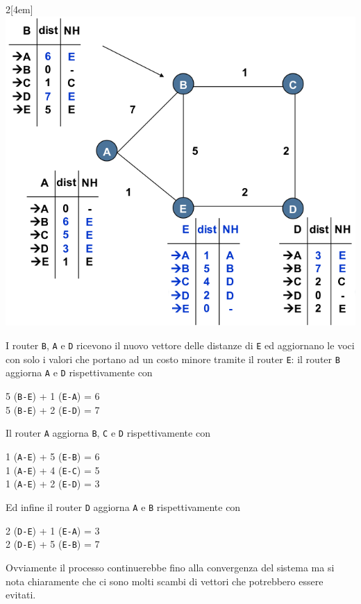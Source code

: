 \documentclass[12pt]{article}
\def\code#1{\texttt{#1}}
\begin{document}
\begin{multicols}{2}[\columnsep4em] 	
	\includegraphics[scale=0.3]{livello_di_rete-img12.png}
	\columnbreak
	
	I router \code{B}, \code{A} e \code{D} ricevono il nuovo vettore delle distanze di \code{E} ed aggiornano le voci con 
	solo i valori che portano ad un costo minore tramite il router \code{E}: il router \code{B} aggiorna \code{A} e \code{D} 
	rispettivamente con
	\begin{center}
		5 (\code{B-E}) + 1 (\code{E-A}) = 6\\
		5 (\code{B-E}) + 2 (\code{E-D}) = 7		
	\end{center}
	
	Il router \code{A} aggiorna \code{B}, \code{C} e \code{D} rispettivamente con
	\begin{center}
		1 (\code{A-E}) + 5 (\code{E-B}) = 6\\
		1 (\code{A-E}) + 4 (\code{E-C}) = 5\\
		1 (\code{A-E}) + 2 (\code{E-D}) = 3		
	\end{center}
	
	Ed infine il router \code{D} aggiorna \code{A} e \code{B} rispettivamente con
	\begin{center}
		2 (\code{D-E}) + 1 (\code{E-A}) = 3\\
		2 (\code{D-E}) + 5 (\code{E-B}) = 7		
	\end{center}
\end{multicols}
Ovviamente il processo continuerebbe fino alla convergenza del sistema ma si nota chiaramente che ci sono molti scambi di 
vettori che potrebbero essere evitati.
\end{document}
